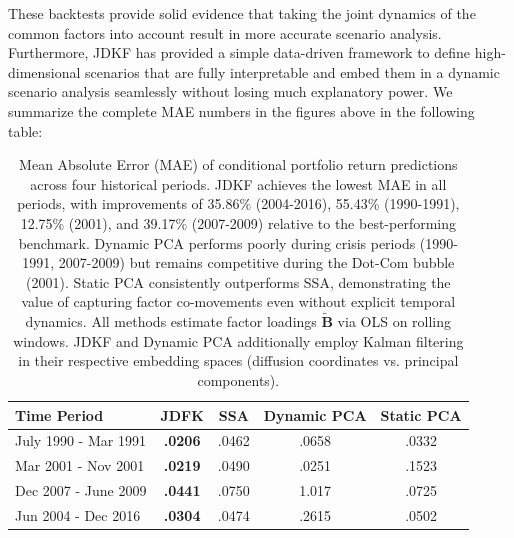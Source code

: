 \documentclass[11pt]{article}
\theoremstyle{plain}
\theoremstyle{definition}
\theoremstyle{remark}
\numberwithin{equation}{section}
\begin{document}
These backtests provide solid evidence that taking the joint dynamics of the common factors into account result in more accurate scenario analysis. Furthermore, JDKF has provided a simple data-driven framework to define high-dimensional scenarios that are fully interpretable and embed them in a dynamic scenario analysis seamlessly without losing much explanatory power. We summarize the complete MAE numbers in the figures above in the following table:
\begin{table}[H]
    \centering
    \begin{tabular}{lcccc}
        \toprule
        \textbf{Time Period} & \textbf{JDFK}  & \textbf{SSA} & \textbf{Dynamic PCA} & \textbf{Static PCA} \\
        \midrule
        July 1990 - Mar 1991 & \textbf{.0206}  & .0462 & .0658 & .0332\\
        Mar 2001 - Nov 2001 & \textbf{.0219} & .0490 & .0251 & .1523\\
        Dec 2007 - June 2009 & \textbf{.0441} & .0750 & 1.017 & .0725\\
        Jun 2004 - Dec 2016 & \textbf{.0304} & .0474 & .2615 & .0502\\
        \bottomrule
    \end{tabular}
\caption{Mean Absolute Error (MAE) of conditional portfolio return predictions across 
four historical periods. JDKF achieves the lowest MAE in all periods, with improvements 
of 35.86\% (2004-2016), 55.43\% (1990-1991), 12.75\% (2001), and 39.17\% (2007-2009) 
relative to the best-performing benchmark. Dynamic PCA performs poorly during  crisis periods (1990-1991, 2007-2009) but remains competitive during the 
Dot-Com bubble (2001). Static PCA 
consistently outperforms SSA, demonstrating the value of capturing factor co-movements 
even without explicit temporal dynamics. All methods estimate factor loadings 
$\tilde{\mathbf{B}}$ via OLS on rolling windows. JDKF and Dynamic PCA additionally 
employ Kalman filtering in their respective embedding spaces (diffusion coordinates 
vs. principal components).}
\label{tab:mae}
    
    \label{tab:mae}
\end{table}
\end{document}
